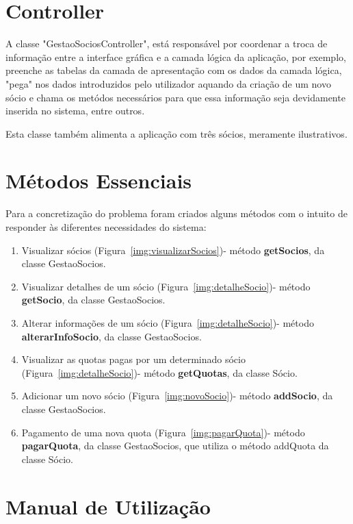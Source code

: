 \documentclass[a4paper]{article}
\begin{document}
\section{Controller}
\label{sec:controller}

A classe "GestaoSociosController", está responsável por coordenar a troca de informação entre a interface gráfica e a camada lógica da aplicação, por exemplo, preenche as tabelas da camada de apresentação com os dados da camada lógica, "pega" nos dados introduzidos pelo utilizador aquando da criação de um novo sócio e chama os metódos necessários para que essa informação seja devidamente inserida no sistema, entre outros.

Esta classe também alimenta a aplicação com três sócios, meramente ilustrativos.

\section{Métodos Essenciais}
\label{sec:metodos}

Para a concretização do problema foram criados alguns métodos com o intuito de responder às diferentes necessidades do sistema:

\begin{enumerate}
    \item Visualizar sócios (Figura~\ref{img:visualizarSocios})- método \textbf{getSocios}, da classe GestaoSocios.
    \item Visualizar detalhes de um sócio (Figura~\ref{img:detalheSocio})- método \textbf{getSocio}, da classe GestaoSocios.
    \item Alterar informações de um sócio (Figura~\ref{img:detalheSocio})- método \textbf{alterarInfoSocio}, da classe GestaoSocios.
    \item Visualizar as quotas pagas por um determinado sócio (Figura~\ref{img:detalheSocio})- método \textbf{getQuotas}, da classe Sócio.
    \item Adicionar um novo sócio (Figura~\ref{img:novoSocio})- método \textbf{addSocio}, da classe GestaoSocios.
    \item Pagamento de uma nova quota (Figura~\ref{img:pagarQuota})- método \textbf{pagarQuota}, da classe GestaoSocios, que utiliza o método addQuota da classe Sócio.
\end{enumerate}


\section{Manual de Utilização}
\label{sec:manual}
\end{document}
